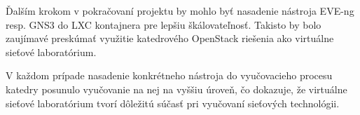Ďalším krokom v pokračovaní projektu by mohlo byť nasadenie nástroja EVE-ng resp. GNS3 do LXC kontajnera pre lepšiu škálovateľnosť. Takisto by bolo zaujímavé preskúmať využitie katedrového OpenStack riešenia ako virtuálne sieťové laboratórium.

V každom prípade nasadenie konkrétneho nástroja do vyučovacieho procesu katedry posunulo vyučovanie na nej na vyššiu úroveň, čo dokazuje, že virtuálne sieťové laboratórium tvorí dôležitú súčasť pri vyučovaní sieťových technológii.